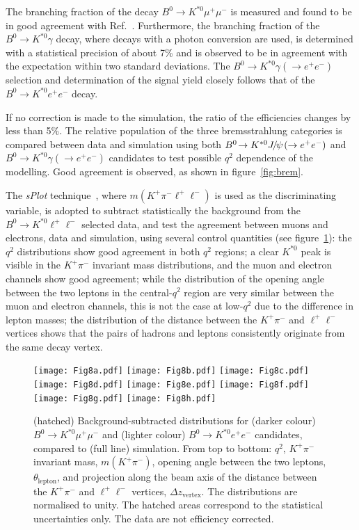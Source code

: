 \documentclass[12pt,a4paper]{article}
\def\Pmu         {\ensuremath{\upmu}\xspace}
\def\Ppi         {\ensuremath{\uppi}\xspace}
\def\Ppsi        {\ensuremath{\uppsi}\xspace}
\def\PB      {\ensuremath{\mathrm{B}}\xspace}
\def\PJ      {\ensuremath{\mathrm{J}}\xspace}
\def\PK      {\ensuremath{\mathrm{K}}\xspace}
\def\Pe      {\ensuremath{\mathrm{e}}\xspace}
\def\Pmu         {\ensuremath{\mu}\xspace}
\def\Ppi         {\ensuremath{\pi}\xspace}
\def\Ppsi        {\ensuremath{\psi}\xspace}
\def\PB      {\ensuremath{B}\xspace}
\def\PJ      {\ensuremath{J}\xspace}
\def\PK      {\ensuremath{K}\xspace}
\def\Pe      {\ensuremath{e}\xspace}
\def\epem       {\ensuremath{\Pe^+\Pe^-}\xspace}
\def\mup        {\ensuremath{\Pmu^+}\xspace}
\def\mun        {\ensuremath{\Pmu^-}\xspace} \def\mumu       {\ensuremath{\Pmu^+\Pmu^-}\xspace}
\def\ellm       {\ensuremath{\ell^-}\xspace}
\def\ellp       {\ensuremath{\ell^+}\xspace}
\def\pion  {\ensuremath{\Ppi}\xspace}
\def\pim   {\ensuremath{\pion^-}\xspace}
\def\kaon  {\ensuremath{\PK}\xspace}
\def\Kp    {\ensuremath{\kaon^+}\xspace}
\def\Kstarz  {\ensuremath{\kaon^{*0}}\xspace}
\def\B       {\ensuremath{\PB}\xspace}
\def\Bd      {\ensuremath{\B^0}\xspace}
\def\jpsi     {\ensuremath{{\PJ\mskip -3mu/\mskip -2mu\Ppsi\mskip 2mu}}\xspace}
\newcommand{\decay}[2]{\ensuremath{#1\!\to #2}\xspace}         \def\ra                 {\ensuremath{\rightarrow}\xspace}
\def\to                 {\ensuremath{\rightarrow}\xspace}
\def\qsq       {\ensuremath{q^2}\xspace}
\def\BdToKstmm    {\decay{\Bd}{\Kstarz\mup\mun}}
\def\sPlot{\mbox{\em sPlot}}
\def\lqsq{low-\qsq}
\def\cqsq{central-\qsq}
\def\mKpi{\ensuremath{m(\KPi)}\xspace}
\def\mKpill{\ensuremath{m(\KPi\ellell)}\xspace}
\def\KPi{\ensuremath{\Kp\pim}\xspace}
\def\ll{\ensuremath{\ellp\ellm}\xspace}
\def\ellell{\ensuremath{\ellp\ellm}\xspace}
\def\BdToKstll{\mbox{\decay{\Bd}{\Kstarz \ll}}\xspace}
\def\BdToKstmm{\mbox{\decay{\Bd}{\Kstarz \mumu}}\xspace}
\def\BdToKstee{\mbox{\decay{\Bd}{\Kstarz \epem}}\xspace}
\def\BdToKstG{\mbox{\decay{\Bd}{\Kstarz \gamma}}\xspace}
\def\BdToKstGee{\mbox{\decay{\Bd}{\Kstarz \gamma(\to\epem)}}\xspace}
\def\BdToKstJPsee{\mbox{\decay{\Bd}{\Kstarz \jpsi(\to\epem)}}\xspace}
\begin{document}
The branching fraction of the decay \BdToKstmm is measured and found to be in good agreement with Ref.~\cite{LHCb-PAPER-2016-012}.
Furthermore, the branching fraction of the \BdToKstG decay, where decays with a photon conversion are used, is determined with a statistical precision of about 7\% and is observed to be in agreement with the expectation within two standard deviations.
The \BdToKstGee selection and determination of the signal yield closely follows that of the \BdToKstee decay.

If no correction is made to the simulation, the ratio of the efficiencies changes by less than 5\%.
The relative population of the three bremsstrahlung categories is compared between data and simulation using both \BdToKstJPsee and \BdToKstGee candidates to test possible \qsq dependence of the modelling.
Good agreement is observed, as shown in figure~\ref{fig:brem}.

The \sPlot\xspace technique~\cite{Pivk:2004ty}, where \mKpill is used as the discriminating variable, is adopted to subtract statistically the background from the \BdToKstll selected data, and test the agreement between muons and electrons, data and simulation, using several control quantities (see figure~\ref{fig:splot}):
the \qsq distributions show good agreement in both \qsq regions;
a clear \Kstarz peak is visible in the \KPi invariant mass distributions, and the muon and electron channels show good agreement;
while the distribution of the opening angle between the two leptons in the \cqsq region are very similar between the muon and electron channels, this is not the case at \lqsq due to the difference in lepton masses;
the distribution of the distance between the \KPi and \ll vertices shows that the pairs of hadrons and leptons consistently originate from the same decay vertex.

\begin{figure}[t!]
\centering
\texttt{[image: Fig8a.pdf]}
\texttt{[image: Fig8b.pdf]}
\texttt{[image: Fig8c.pdf]}
\texttt{[image: Fig8d.pdf]}
\texttt{[image: Fig8e.pdf]}
\texttt{[image: Fig8f.pdf]}
\texttt{[image: Fig8g.pdf]}
\texttt{[image: Fig8h.pdf]}
\caption{(hatched) Background-subtracted distributions for (darker colour) \BdToKstmm and (lighter colour) \BdToKstee candidates, compared to (full line) simulation. From top to bottom: \qsq, \KPi invariant mass, \mKpi, opening angle between the two leptons, $\theta_{\textrm{lepton}}$, and projection along the beam axis of the distance between the \KPi and \ll vertices, $\Delta z_{\textrm{vertex}}$. The distributions are normalised to unity. The hatched areas correspond to the statistical uncertainties only. The data are not efficiency corrected.}
\label{fig:splot}
\end{figure}
\end{document}
